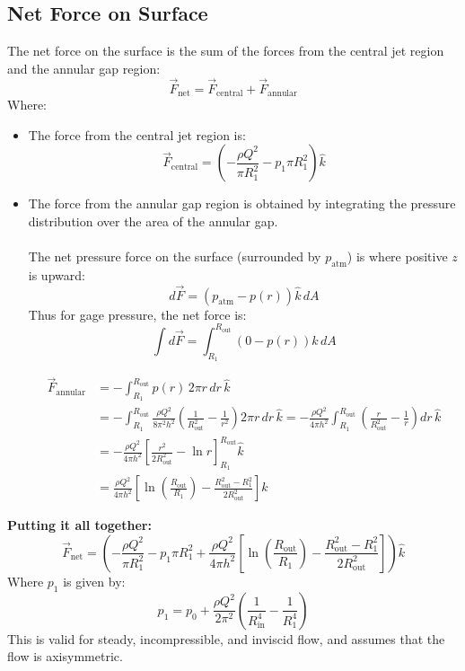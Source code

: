 \documentclass[11pt]{article}
\begin{document}
\subsection*{Net Force on Surface}
The net force on the surface is the sum of the forces from the central jet region and the annular gap region:
\[\vec{F}_{\text{net}} = \vec{F}_{\text{central}} + \vec{F}_{\text{annular}}\]
Where:
\begin{itemize}
    \item The force from the central jet region is:
    \[\vec{F}_{\text{central}} = \left(-\frac{\rho Q^2}{\pi R_1^2} - p_1 \pi R_1^2\right) \hat k\]
    \item The force from the annular gap region is obtained by integrating the pressure distribution over the area of the annular gap.\\\\
    The net pressure force on the surface (surrounded by $p_\text{atm}$) is where positive $z$ is upward:
    \[d\vec{F} = (p_\text{atm}-p(r))\hat{k}\,dA\]
    Thus for gage pressure, the net force is:
    \[\int d\vec{F} = \int_{R_1}^{R_{\mathrm{out}}} (0-p(r))\hat{k}\,dA\]

\begin{align*}
\vec F_{\mathrm{annular}}
&=-\int_{R_1}^{R_{\mathrm{out}}}p(r)\,2\pi r\,dr\,\hat k\\
&=-\int_{R_1}^{R_{\mathrm{out}}}\frac{\rho Q^2}{8\pi^2h^2}
\left(\frac{1}{R_{\mathrm{out}}^2}-\frac{1}{r^2}\right)2\pi r\,dr\,\hat k =-\frac{\rho Q^2}{4\pi h^2}\int_{R_1}^{R_{\mathrm{out}}}\left(\frac{r}{R_{\mathrm{out}}^2}-\frac{1}{r}\right)dr\,\hat k\\
&=-\frac{\rho Q^2}{4\pi h^2}
\left[\frac{r^2}{2R_{\mathrm{out}}^2}-\ln r\right]_{R_1}^{R_{\mathrm{out}}}\hat k\\
&=\frac{\rho Q^2}{4\pi h^2}
\left[\ln\left(\frac{R_{\mathrm{out}}}{R_1}\right)
-\frac{R_{\mathrm{out}}^2-R_1^2}{2R_{\mathrm{out}}^2}\right]\hat k
\end{align*}
\end{itemize}
\textbf{Putting it all together:}
\[\boxed{\vec F_{\mathrm{net}} = \left(-\frac{\rho Q^2}{\pi R_1^2} - p_1 \pi R_1^2+ \frac{\rho Q^2}{4\pi h^2}\left[\ln\left(\frac{R_{\mathrm{out}}}{R_1}\right) - \frac{R_{\mathrm{out}}^2-R_1^2}{2R_{\mathrm{out}}^2}\right]\right)\hat k}\]
Where $p_1$ is given by:
\[
\boxed{p_1=p_0+\frac{\rho Q^2}{2\pi^2}\left(\frac{1}{R_{\mathrm{in}}^4}-\frac{1}{R_1^4}\right)}
\]
This is valid for steady, incompressible, and inviscid flow, and assumes that the flow is axisymmetric.\\\\
\end{document}

